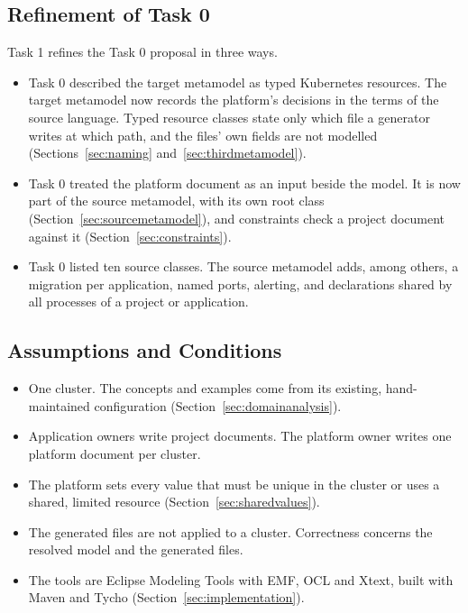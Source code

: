 \subsection{Refinement of Task 0}

Task 1 refines the Task 0 proposal in three ways.

\begin{itemize}
  \item Task 0 described the target metamodel as typed Kubernetes resources.
    The target metamodel now records the platform's decisions in the terms of
    the source language. Typed resource classes state only which file a
    generator writes at which path, and the files' own fields are not modelled
    (Sections~\ref{sec:naming} and~\ref{sec:thirdmetamodel}).
  \item Task 0 treated the platform document as an input beside the model. It
    is now part of the source metamodel, with its own root class
    (Section~\ref{sec:sourcemetamodel}), and constraints check a project
    document against it (Section~\ref{sec:constraints}).
  \item Task 0 listed ten source classes. The source metamodel adds, among
    others, a migration per application, named ports, alerting, and
    declarations shared by all processes of a project or application.
\end{itemize}

\subsection{Assumptions and Conditions}

\begin{itemize}
  \item One cluster. The concepts and examples come from its existing,
    hand-maintained configuration (Section~\ref{sec:domainanalysis}).
  \item Application owners write project documents. The platform owner writes
    one platform document per cluster.
  \item The platform sets every value that must be unique in the cluster or
    uses a shared, limited resource (Section~\ref{sec:sharedvalues}).
  \item The generated files are not applied to a cluster. Correctness concerns
    the resolved model and the generated files.
  \item The tools are Eclipse Modeling Tools with EMF, OCL and Xtext, built
    with Maven and Tycho (Section~\ref{sec:implementation}).
\end{itemize}


